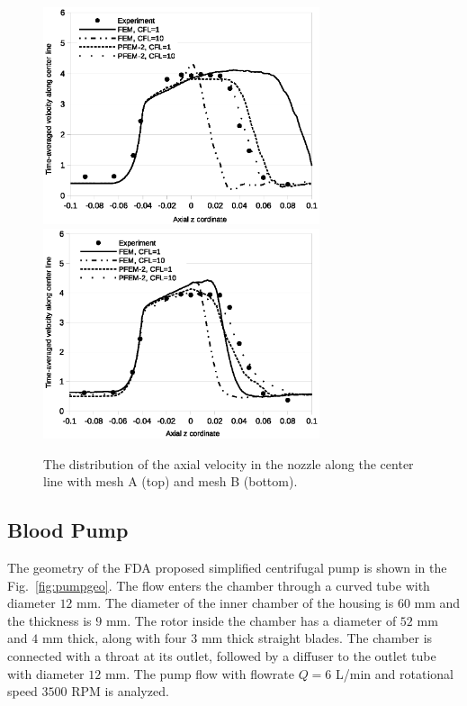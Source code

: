 \begin{figure}[htbp]
    \centering
    \includegraphics[width=3.2in]{imgs/nozzle_pump/nozzle_midvel_fm2.eps}
    \includegraphics[width=3.2in]{imgs/nozzle_pump/nozzle_midvel_pm2.eps}
    \caption{The distribution of the axial velocity in the nozzle along the center line with mesh A (top) and mesh B (bottom).
}
    \label{fig:nozzlemidvel}
\end{figure}

\subsection{Blood Pump}

The geometry of the FDA proposed simplified centrifugal pump is shown in the Fig.~\ref{fig:pumpgeo}. The flow enters the chamber through a curved tube with diameter $12$ mm. The diameter of the inner chamber of the housing is $60$ mm and the thickness is $9$ mm. The rotor inside the chamber has a diameter of $52$ mm and $4$ mm thick, along with four $3$ mm thick straight blades. The chamber is connected with a throat at its outlet, followed by a diffuser to the outlet tube with diameter $12$ mm. The pump flow with flowrate $Q=6$ L/min and rotational speed $3500$ RPM is analyzed. 

